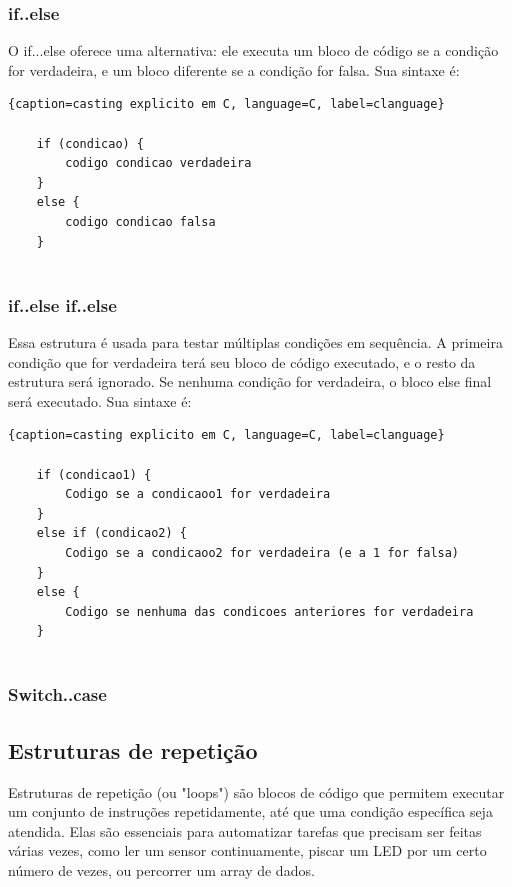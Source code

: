 \documentclass{report}
\begin{document}
	\subsubsection{if..else}
	O if...else oferece uma alternativa: ele executa um bloco de código se a condição for verdadeira, e um bloco diferente se a condição for falsa. Sua sintaxe é:
	
	\begin{center}
		
		\begin{lstlisting}{caption=casting explicito em C, language=C, label=clanguage}	
			
	if (condicao) {
		codigo condicao verdadeira
	} 
	else {
		codigo condicao falsa
	}
			
		\end{lstlisting}
	\end{center}
	
	
	
	\subsubsection{if..else if..else}
	Essa estrutura é usada para testar múltiplas condições em sequência. A primeira condição que for verdadeira terá seu bloco de código executado, e o resto da estrutura será ignorado. Se nenhuma condição for verdadeira, o bloco else final será executado. Sua sintaxe é:
	
	\begin{center}
		
		\begin{lstlisting}{caption=casting explicito em C, language=C, label=clanguage}	
			
	if (condicao1) {
		Codigo se a condicaoo1 for verdadeira
	} 
	else if (condicao2) {
		Codigo se a condicaoo2 for verdadeira (e a 1 for falsa)
	} 
	else {
		Codigo se nenhuma das condicoes anteriores for verdadeira
	}
			
		\end{lstlisting}
	\end{center}
	
	\subsubsection{Switch..case}
	
	
	\subsection{Estruturas de repetição}
	Estruturas de repetição (ou "loops") são blocos de código que permitem executar um conjunto de instruções repetidamente, até que uma condição específica seja atendida. Elas são essenciais para automatizar tarefas que precisam ser feitas várias vezes, como ler um sensor continuamente, piscar um LED por um certo número de vezes, ou percorrer um array de dados.
	
\end{document}
